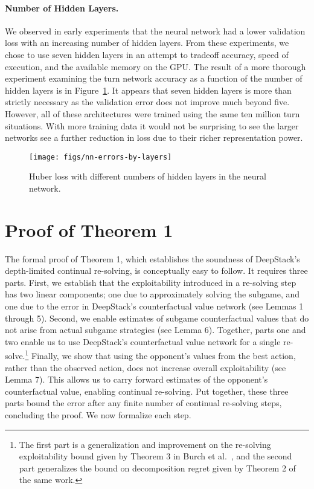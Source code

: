\paragraph*{Number of Hidden Layers.}
We observed in early experiments that the neural network had a lower validation loss with an increasing number of hidden layers.  From these experiments, we chose to use seven hidden layers in an attempt to tradeoff accuracy, speed of execution, and the available memory on the GPU.  The result of a more thorough experiment examining the turn network accuracy as a function of the number of hidden layers is in Figure~\ref{fig:nn-errors-by-layers}.  It appears that seven hidden layers is more than strictly necessary as the validation error does not improve much beyond five.  However, all of these architectures were trained using the same ten million turn situations.  With more training data it would not be surprising to see the larger networks see a further reduction in loss due to their richer representation power.

\begin{figure}[t]
\centering
\texttt{[image: figs/nn-errors-by-layers]}
\caption{Huber loss with different numbers of hidden layers in the neural network.}\label{fig:nn-errors-by-layers}
\end{figure}


\section*{Proof of Theorem 1}

The formal proof of Theorem 1, which establishes the soundness of DeepStack's
depth-limited continual re-solving, is conceptually easy to follow.   It
requires three parts.  First, we establish that the
exploitability introduced in a re-solving step has two linear components; one due
to approximately solving the subgame, and one due to the error in DeepStack's
counterfactual value network (see Lemmas 1 through 5).  Second, we enable estimates of
subgame counterfactual values that do not arise from actual subgame strategies (see Lemma 6).
Together, parts one and two enable us to use DeepStack's counterfactual value
network for a single re-solve.\footnote{The first part is a generalization and improvement
on the re-solving exploitability bound given by Theorem 3 in Burch et al.~\cite{cprg:cfrd},
and the second part generalizes the bound on decomposition regret given by Theorem 2 of
the same work.}  Finally, we show that using the opponent's values from the
best action, rather than the observed action, does not increase overall
exploitability (see Lemma 7).  This allows us to carry forward estimates of the opponent's
counterfactual value, enabling continual re-solving.  Put together,
these three parts bound the error after any finite number of continual re-solving
steps, concluding the proof.  We now formalize each step.

